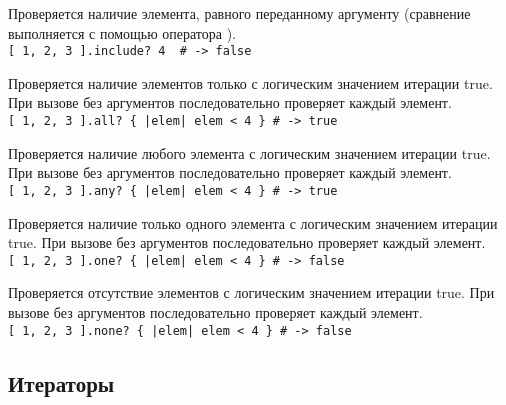 \begin{methodlist}  
  Проверяется наличие элемента, равного переданному аргументу (сравнение выполняется с помощью оператора \method{==}). 
  \\\verb![ 1, 2, 3 ].include? 4  # -> false!
  
  Проверяется наличие элементов только с логическим значением итерации true. При вызове без аргументов последовательно проверяет каждый элемент. 
  \\\verb![ 1, 2, 3 ].all? { |elem| elem < 4 } # -> true!
  
  Проверяется наличие любого элемента с логическим значением итерации true. При вызове без аргументов последовательно проверяет каждый элемент. 
  \\\verb![ 1, 2, 3 ].any? { |elem| elem < 4 } # -> true!
 
  Проверяется наличие только одного элемента с логическим значением итерации true. При вызове без аргументов последовательно проверяет каждый элемент. 
  \\\verb![ 1, 2, 3 ].one? { |elem| elem < 4 } # -> false!
 
  Проверяется отсутствие элементов с логическим значением итерации true. При вызове без аргументов последовательно проверяет каждый элемент. 
  \\\verb![ 1, 2, 3 ].none? { |elem| elem < 4 } # -> false!
\end{methodlist}

\subsection*{Итераторы}

